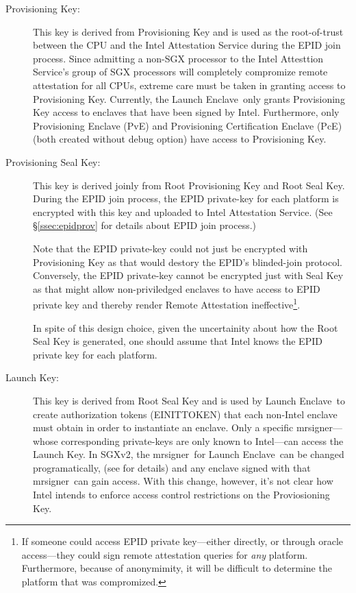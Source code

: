 \documentclass[10pt]{article}
\newcommand{\secref}[1]{\S\ref{#1}}
\newcommand{\mrsigner}{\textsf{mrsigner}}
\newcommand{\pve}{\textsf{PvE}}
\newcommand{\pce}{\textsf{PcE}}
\newcommand{\launchenclave}{\textsf{Launch Enclave}}
\begin{document}
  \begin{description}
  \item[Provisioning Key:] This key is derived from Provisioning Key
    and is used as the root-of-trust between the CPU and the Intel
    Attestation Service during the EPID join process. Since admitting
    a non-SGX processor to the Intel Attesttion Service's group of SGX
    processors will completely compromize remote attestation for all
    CPUs, extreme care must be taken in granting access to
    Provisioning Key. Currently, the \launchenclave\ only grants
    Provisioning Key access to enclaves that have been signed by
    Intel. Furthermore, only Provisioning Enclave (\pve) and
    Provisioning Certification Enclave (\pce) (both created without
    debug option) have access to Provisioning Key.

  \item[Provisioning Seal Key:] This key is derived joinly from Root
    Provisioning Key and Root Seal Key. During the EPID join process,
    the EPID private-key for each platform is encrypted with this key
    and uploaded to Intel Attestation Service. (See
    \secref{ssec:epidprov} for details about EPID join process.)

    Note that the EPID private-key could not just be encrypted with
    Provisioning Key as that would destory the EPID's blinded-join
    protocol. Conversely, the EPID private-key cannot be encrypted
    just with Seal Key as that might allow non-priviledged enclaves to
    have access to EPID private key and thereby render Remote
    Attestation ineffective\footnote{If someone could access EPID
      private key---either directly, or through oracle access---they
      could sign remote attestation queries for \textit{any}
      platform. Furthermore, because of anonymimity, it will be
      difficult to determine the platform that was compromized.}.

    In spite of this design choice, given the uncertainity about how
    the Root Seal Key is generated, one should assume that Intel knows
    the EPID private key for each platform.

  \item[Launch Key:] This key is derived from Root Seal Key and is
    used by \launchenclave\ to create authorization tokens
    (\textsf{EINITTOKEN}) that each non-Intel enclave must obtain in
    order to instantiate an enclave. Only a specific \mrsigner---whose
    corresponding private-keys are only known to Intel---can access
    the Launch Key. In SGXv2, the \mrsigner\ for \launchenclave\ can
    be changed programatically, (see \cite[\S39.1.4]{intelsdm} for
    details) and any enclave signed with that \mrsigner\ can gain
    access. With this change, however, it's not clear how Intel
    intends to enforce access control restrictions on the
    Proviosioning Key.


\end{description}
\end{document}
